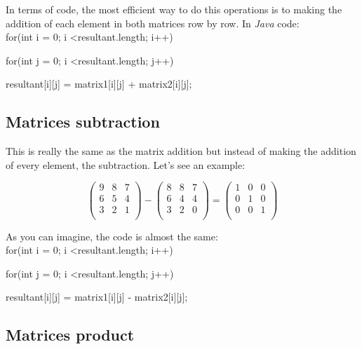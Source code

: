\documentclass{article}
\begin{document}
In terms of code, the most efficient way to do this operations is to making the
addition of each element in both matrices row by row. In \textit{Java} code:\\

for(int i = 0; i \textless resultant.length; i++)

\quad \quad \quad for(int j = 0; i \textless resultant.length; j++)

\quad \quad \quad \quad \quad \quad resultant[i][j] = matrix1[i][j] + matrix2[i][j];


\subsection{Matrices subtraction}

This is really the same as the matrix addition but instead of making the addition of every element,
the subtraction. Let's see an example:

\[
\begin{pmatrix}
    9 & 8 & 7 \\
    6 & 5 & 4 \\
    3 & 2 & 1 \\
\end{pmatrix}
  - 
\begin{pmatrix}
    8 & 8 & 7 \\
    6 & 4 & 4 \\
    3 & 2 & 0 \\
\end{pmatrix}
=
\begin{pmatrix}
    1 & 0 & 0 \\
    0 & 1 & 0 \\
    0 & 0 & 1 \\
\end{pmatrix}
\]

As you can imagine, the code is almost the same:\\

for(int i = 0; i \textless resultant.length; i++)

\quad \quad \quad for(int j = 0; i \textless resultant.length; j++)

\quad \quad \quad \quad \quad \quad resultant[i][j] = matrix1[i][j] - matrix2[i][j];\\


\subsection{Matrices product}
\end{document}
